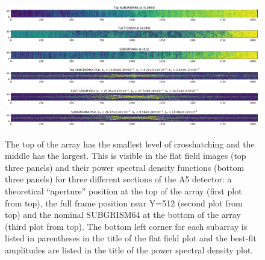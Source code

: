 \documentclass[]{aastex62}
\begin{document}
\begin{figure}[!hbtp]
\centering
\includegraphics[width=0.99\columnwidth]{subg_pos_topGrism64.pdf}\\
\includegraphics[width=0.99\columnwidth]{subg_pos_fullfGrismRegion.pdf}\\
\includegraphics[width=0.99\columnwidth]{subg_pos_subgrism64.pdf}\\
\vspace{0.2in}
\includegraphics[width=0.99\columnwidth]{subg_pos_topGrism64_psd.pdf}\\
\includegraphics[width=0.99\columnwidth]{subg_pos_fullfGrismRegion_psd.pdf}\\
\includegraphics[width=0.99\columnwidth]{subg_pos_subgrism64_psd.pdf}\\
\caption{
The top of the array has the smallest level of crosshatching and the middle has the largest.
This is visible in the flat field images (top three panels) and their power spectral density functions (bottom three panels) for three different sections of the A5 detector: a theoretical ``aperture'' position at the top of the array (first plot from top), the full frame position near Y=512 (second plot from top) and the nominal SUBGRISM64 at the bottom of the array (third plot from top).
The bottom left corner for each subarray is listed in parentheses in the title of the flat field plot and the best-fit amplitudes are listed in the title of the power spectral density plot.
 }\label{fig:subpixScanSimulation}
\end{figure}
\end{document}
